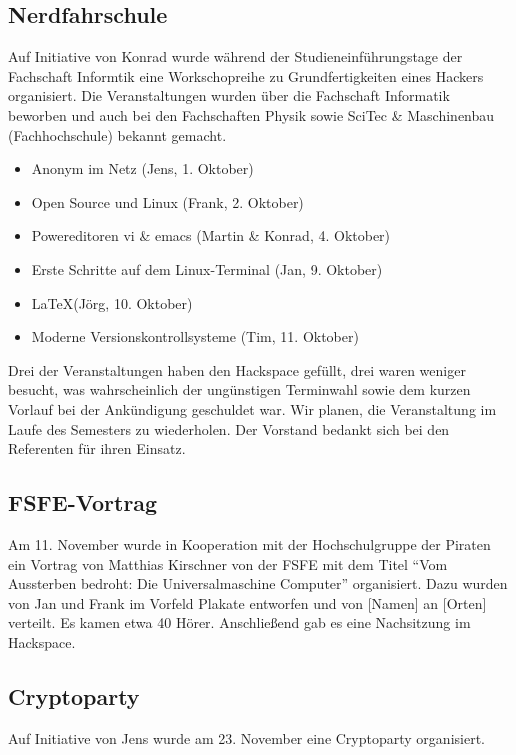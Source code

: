 \documentclass[10pt,DIV16]{scrartcl}
\begin{document}
\subsection{Nerdfahrschule}

Auf Initiative von Konrad wurde während der Studieneinführungstage der
Fachschaft Informtik eine Workschopreihe zu Grundfertigkeiten eines Hackers
organisiert.  Die Veranstaltungen wurden über die Fachschaft Informatik
beworben und auch bei den Fachschaften Physik sowie SciTec \& Maschinenbau
(Fachhochschule) bekannt gemacht.

\begin{itemize}
	\item Anonym im Netz (Jens, 1. Oktober)
	\item Open Source und Linux (Frank, 2. Oktober)
	\item Powereditoren vi \& emacs (Martin \& Konrad, 4. Oktober)
	\item Erste Schritte auf dem Linux-Terminal (Jan, 9. Oktober)
	\item \LaTeX (Jörg, 10. Oktober)
	\item Moderne Versionskontrollsysteme (Tim, 11. Oktober)
\end{itemize}
Drei der Veranstaltungen haben den Hackspace gefüllt, drei waren weniger
besucht, was wahrscheinlich der ungünstigen Terminwahl sowie dem kurzen
Vorlauf bei der Ankündigung geschuldet war.  Wir planen, die Veranstaltung im
Laufe des Semesters zu wiederholen.  Der Vorstand bedankt sich bei den
Referenten für ihren Einsatz.

\subsection{FSFE-Vortrag}

Am 11. November wurde in Kooperation mit der Hochschulgruppe der Piraten ein
Vortrag von Matthias Kirschner von der FSFE mit dem Titel "`Vom Aussterben
bedroht: Die Universalmaschine Computer"' organisiert.  Dazu wurden von Jan
und Frank im Vorfeld Plakate entworfen und von [Namen] an [Orten] verteilt.
Es kamen etwa 40 Hörer.  Anschließend gab es eine Nachsitzung im Hackspace.

\subsection{Cryptoparty}

Auf Initiative von Jens wurde am 23. November eine Cryptoparty organisiert.
\end{document}
